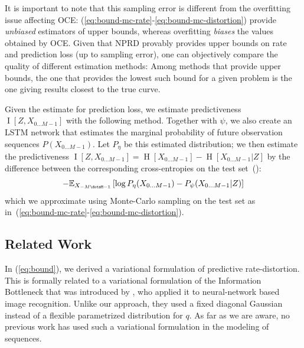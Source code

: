 \documentclass[entropy,article,submit,moreauthors,pdftex,10pt,a4paper]{Definitions/mdpi}
\newcommand{\finitefuture}{X_{0\dots M-1}}
\begin{document}
It is important to note that this sampling error is different from the overfitting issue affecting OCE: 
(\ref{eq:bound-mc-rate}-\ref{eq:bound-mc-distortion}) provide \emph{unbiased} estimators of upper bounds, whereas overfitting \emph{biases} the values obtained by OCE.
Given that NPRD provably provides upper bounds on rate and prediction loss (up to sampling error), one can objectively compare the quality of different estimation methods:
Among methods that provide upper bounds, the one that provides the lowest such bound for a given problem is the one giving results closest to the true curve.

Given the estimate for prediction loss, we estimate predictiveness $\operatorname{I}[Z, \finitefuture]$ with the following method.
Together with $\psi$, we also create an LSTM network that estimates the marginal probability of future observation sequences $P(\finitefuture)$. Let $P_\eta$ be this estimated distribution; we then estimate the predictiveness $\operatorname{I}[Z, \finitefuture] = \operatorname{H}[\finitefuture] - \operatorname{H}[\finitefuture|Z]$ by the difference between the corresponding cross-entropies on the test set~(\cite{mcallester2018formal}):
\begin{equation}\label{eq:bound-mc-predictiveness}
- \mathbb{E}_{X_{-M\dotsM-1}}\left[\log P_\eta(\finitefuture) - P_\psi(\finitefuture | Z)\right]
\end{equation}
which we approximate using Monte-Carlo sampling on the test set as in~(\ref{eq:bound-mc-rate}-\ref{eq:bound-mc-distortion}).








\subsection{Related Work}
In (\ref{eq:bound}), we derived a variational formulation of predictive rate-distortion.
This is formally related to a variational formulation of the Information Bottleneck that was introduced by \cite{alemi-deep-2016}, who applied it to neural-network based image recognition.
Unlike our approach, they used a fixed diagonal Gaussian instead of a flexible parametrized distribution for $q$.
As far as we are aware, no previous work has used such a variational formulation in the modeling of sequences.
\end{document}
